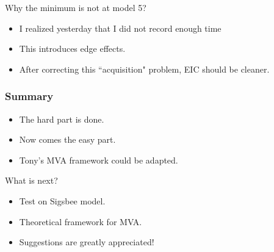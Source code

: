 \begin{frame}
Why the minimum is not at model 5? 
    \begin{itemize}
        \item I realized yesterday that I did not record enough time
        \item This introduces edge effects.
        \item After correcting this ``acquisition" problem, EIC should be cleaner.
    \end{itemize}
\end{frame}



\begin{frame} \frametitle{Summary}
    \begin{itemize}
        \item The hard part is done. 
        \item Now comes the easy part.
        \item Tony's MVA framework could be adapted.
    \end{itemize}
\end{frame}

\begin{frame}
    What is next?
    \begin{itemize}
        \item Test on Sigsbee model.
        \item Theoretical framework for MVA.
        \item Suggestions are greatly appreciated!
    \end{itemize}
\end{frame}

